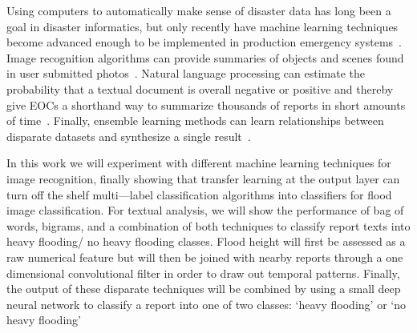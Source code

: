   Using computers to automatically make sense of disaster data has long
  been a goal in disaster informatics, but only recently have machine
  learning techniques become advanced enough to be implemented in production
  emergency systems~\cite{meierDigitalHumanitariansHow2015}. Image
  recognition algorithms can provide summaries of objects and scenes found
  in user submitted photos~\cite{nguyenRapidClassificationCrisisRelated,
  donahueDeCAFDeepConvolutional2013}. Natural language processing can
  estimate the probability that a textual document is overall negative or
  positive and thereby give EOCs a shorthand way to summarize thousands of
  reports in short amounts of
  time~\cite{nguyenRapidClassificationCrisisRelated,
  nagyCrowdSentimentDetection2012}. Finally, ensemble learning methods can
  learn relationships between disparate datasets and synthesize a single
  result~\cite{mouzannarDamageIdentificationSocial2018}.
  
  In this work we will experiment with different machine learning techniques
  for image recognition, finally showing that transfer learning at the 
  output layer can turn off the shelf multi---label  classification
  algorithms into classifiers for flood image classification. For textual analysis, 
  we will show the performance of bag of words, bigrams, and a combination of 
  both techniques to classify report texts into heavy flooding/ no heavy flooding classes.
  Flood height will first be assessed as a raw numerical feature but will then be 
  joined with nearby reports through a one dimensional convolutional filter in order
  to draw out temporal patterns. Finally, the output of these disparate
  techniques will be combined by using a small deep neural network to classify
  a report into one of two classes: `heavy flooding' or `no heavy flooding'
  
